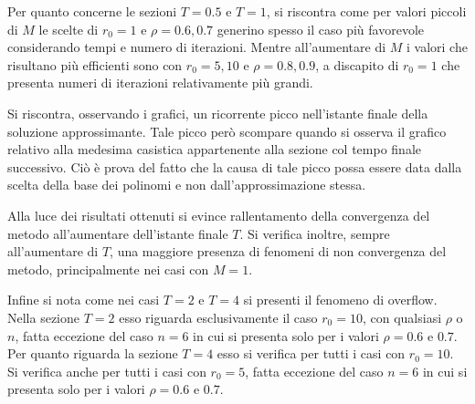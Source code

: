 \documentclass[a4paper,11pt,openright]{report}
\begin{document}
Per quanto concerne le sezioni $T = 0.5$ e $T =1$, si riscontra come per valori piccoli di $M$ le scelte di $r_0 = 1$ e $\rho = 0.6, 0.7$ generino spesso il caso più favorevole considerando tempi e numero di iterazioni. Mentre all'aumentare di $M$ i valori che risultano più efficienti sono con $r_0=5, 10$ e $\rho = 0.8, 0.9$, a discapito di $r_0=1$ che presenta numeri di iterazioni relativamente più grandi.

Si riscontra, osservando i grafici, un ricorrente picco nell'istante finale della soluzione approssimante. Tale picco però scompare quando si osserva il grafico relativo alla medesima casistica appartenente alla sezione col tempo finale successivo. Ciò è prova del fatto che la causa di tale picco possa essere data dalla scelta della base dei polinomi e non dall'approssimazione stessa.

Alla luce dei risultati ottenuti si evince rallentamento della convergenza del metodo all'aumentare dell'istante finale $T$. Si verifica inoltre, sempre all'aumentare di $T$, una maggiore presenza di fenomeni di non convergenza del metodo, principalmente nei casi con $M=1$. 

Infine si nota come nei casi $T = 2$ e $T = 4$ si presenti il fenomeno di overflow. Nella sezione $T = 2$ esso riguarda esclusivamente il caso $r_0 = 10$, con qualsiasi $\rho$ o $n$, fatta eccezione del caso $n = 6$ in cui si presenta solo per i valori $\rho = 0.6 $ e $0.7$. Per quanto riguarda la sezione $T = 4$ esso si verifica per tutti i casi con $r_0 = 10$. Si verifica anche per tutti i casi con $r_0 = 5$, fatta eccezione del caso $n = 6$ in cui si presenta solo per i valori $\rho = 0.6 $ e $0.7$.
\end{document}
